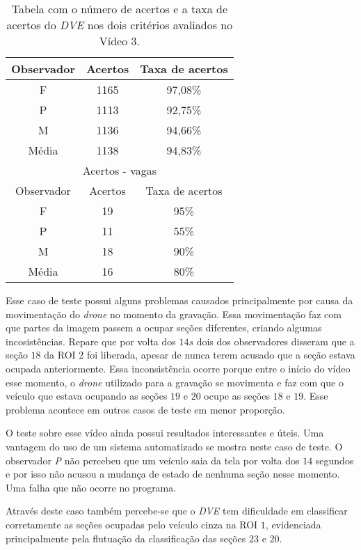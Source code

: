 \begin{table}[H]
\begin{center}
\begin{tabular}{|c||c||c|}
\hline
Observador & Acertos & Taxa de acertos \\ \hline
F & 1165 & 97,08\% \\  \hline
P & 1113 & 92,75\% \\ \hline
M & 1136 & 94,66\% \\ \hline
Média & 1138 & 94,83\% \\
\hline
\hline
\multicolumn{3}{|c|}{Acertos - vagas}  \\ \hline \hline
Observador & Acertos & Taxa de acertos \\ \hline
F & 19 & 95\% \\  \hline
P & 11 & 55\% \\ \hline
M & 18 & 90\% \\ \hline
Média & 16 & 80\% \\
\hline
\end{tabular}
\end{center}
\caption{Tabela com o número de acertos e a taxa de acertos do \textit{DVE} nos dois critérios avaliados no Vídeo 3.}
\label{tab:rvideo3}
\end{table}



Esse caso de teste possui alguns problemas causados principalmente por causa da movimentação do \textit{drone} no momento da gravação. Essa movimentação faz com que partes da imagem passem a ocupar seções diferentes, criando algumas incosistências. Repare que por volta dos $14s$ dois dos observadores disseram que a seção $18$ da ROI $2$ foi liberada, apesar de nunca terem acusado que a seção estava ocupada anteriormente. Essa inconsistência ocorre porque entre o início do vídeo esse momento, o \textit{drone} utilizado para a gravação se movimenta e faz com que o veículo que estava ocupando as  seções $19$ e $20$ ocupe as seções $18$ e $19$. Esse problema acontece em outros casos de teste em menor proporção.

O teste sobre esse vídeo ainda possui resultados interessantes e úteis. Uma vantagem do uso de um sistema automatizado se mostra neste caso de teste. O observador \textit{P} não percebeu que um veículo saia da tela por volta dos $14$ segundos e por isso não acusou a mudança de estado de nenhuma seção nesse momento. Uma falha que não ocorre no programa.

Através deste caso também percebe-se que o \textit{DVE} tem dificuldade em classificar corretamente as seções ocupadas pelo veículo cinza na ROI $1$, evidenciada principalmente pela flutuação da classificação das seções $23$ e $20$.


